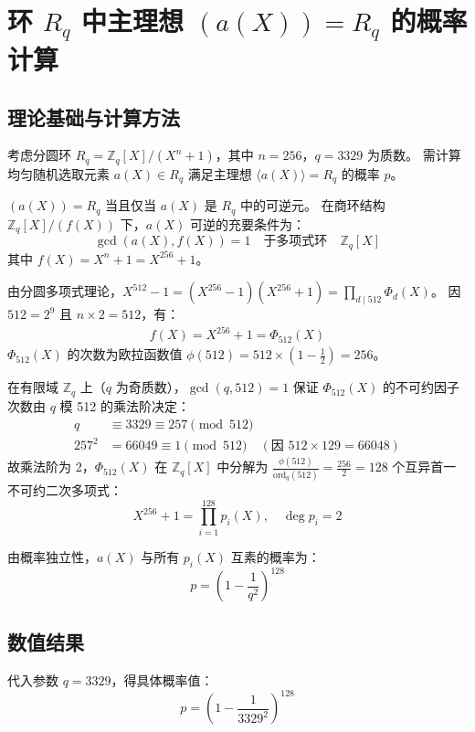 \documentclass[12pt,a4paper]{article}
\numberwithin{equation}{section}
\begin{document}
\section[环 Rq 中主理想 a(X)=Rq 的概率计算]{环 $R_q$ 中主理想 $( a(X) ) = R_q$ 的概率计算}
\subsection{理论基础与计算方法}

考虑分圆环 $R_q = \mathbb{Z}_q[X]/(X^n + 1)$，其中 $n = 256$，$q = 3329$ 为质数。
需计算均匀随机选取元素 $a(X) \in R_q$ 满足主理想 $\langle a(X) \rangle = R_q$ 的概率 $p$。

$( a(X) ) = R_q$ 当且仅当 $a(X)$ 是 $R_q$ 中的可逆元。
在商环结构 $\mathbb{Z}_q[X]/(f(X))$ 下，$a(X)$ 可逆的充要条件为：
\[
\gcd(a(X), f(X)) = 1 \quad \text{于多项式环} \quad \mathbb{Z}_q[X]
\]
其中 $f(X) = X^n + 1 = X^{256} + 1$。

由分圆多项式理论，$X^{512} - 1 = (X^{256} - 1)(X^{256} + 1) = \prod_{d \mid 512} \Phi_d(X)$。
因 $512 = 2^9$ 且 $n \times 2 = 512$，有：
\begin{align}
f(X) = X^{256} + 1 = \Phi_{512}(X)
\end{align}
$\Phi_{512}(X)$ 的次数为欧拉函数值 $\phi(512) = 512 \times (1 - \frac{1}{2}) = 256$。

在有限域 $\mathbb{Z}_q$ 上（$q$ 为奇质数），$\gcd(q, 512) = 1$ 保证 $\Phi_{512}(X)$ 的不可约因子次数由 $q$ 模 512 的乘法阶决定：
\begin{align*}
q & \equiv 3329 \equiv 257 \pmod{512} \\
257^2 & = 66049 \equiv 1 \pmod{512} \quad (\text{因 } 512 \times 129 = 66048)
\end{align*}
故乘法阶为 2，$\Phi_{512}(X)$ 在 $\mathbb{Z}_q[X]$ 中分解为 $\frac{\phi(512)}{\mathrm{ord}_q(512)} = \frac{256}{2} = 128$ 个互异首一不可约二次多项式：
\[
X^{256} + 1 = \prod_{i=1}^{128} p_i(X), \quad \deg p_i = 2
\]

由概率独立性，$a(X)$ 与所有 $p_i(X)$ 互素的概率为：
\begin{equation}
p = \left(1 - \frac{1}{q^2}\right)^{128}
\end{equation}

\subsection{数值结果}
代入参数 $q = 3329$，得具体概率值：
\begin{equation}
p = \left(1 - \frac{1}{3329^2}\right)^{128}
\end{equation}
\end{document}
